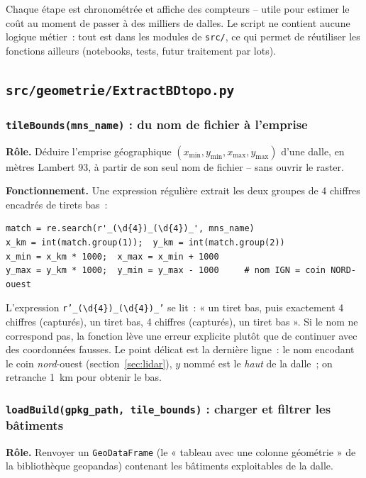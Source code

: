 \documentclass[11pt,a4paper]{article}
\newcommand{\fichier}[1]{\texttt{#1}}
\newcommand{\fonction}[1]{\texttt{#1}}
\begin{document}
Chaque étape est chronométrée et affiche des compteurs -- utile pour estimer le
coût au moment de passer à des milliers de dalles. Le script ne contient aucune
logique métier~: tout est dans les modules de \fichier{src/}, ce qui permet de
réutiliser les fonctions ailleurs (notebooks, tests, futur traitement par lots).

\subsection{\fichier{src/geometrie/ExtractBDtopo.py}}

\subsubsection{\fonction{tileBounds(mns\_name)} : du nom de fichier à l'emprise}

\textbf{Rôle.} Déduire l'emprise géographique $(x_{\min}, y_{\min}, x_{\max},
y_{\max})$ d'une dalle, en mètres Lambert 93, à partir de son seul nom de
fichier -- sans ouvrir le raster.

\textbf{Fonctionnement.} Une expression régulière extrait les deux groupes de 4
chiffres encadrés de tirets bas~:

\begin{lstlisting}
match = re.search(r'_(\d{4})_(\d{4})_', mns_name)
x_km = int(match.group(1));  y_km = int(match.group(2))
x_min = x_km * 1000;  x_max = x_min + 1000
y_max = y_km * 1000;  y_min = y_max - 1000     # nom IGN = coin NORD-ouest
\end{lstlisting}

L'expression \fonction{r'\_(\textbackslash d\{4\})\_(\textbackslash d\{4\})\_'}
se lit~: « un tiret bas, puis exactement 4 chiffres (capturés), un tiret bas, 4
chiffres (capturés), un tiret bas ». Si le nom ne correspond pas, la fonction
lève une erreur explicite plutôt que de continuer avec des coordonnées fausses.
Le point délicat est la dernière ligne~: le nom encodant le coin
\emph{nord}-ouest (section~\ref{sec:lidar}), $y$ nommé est le \emph{haut} de la
dalle~; on retranche 1~km pour obtenir le bas.

\subsubsection{\fonction{loadBuild(gpkg\_path, tile\_bounds)} : charger et filtrer les bâtiments}

\textbf{Rôle.} Renvoyer un \fonction{GeoDataFrame} (le « tableau avec une
colonne géométrie » de la bibliothèque geopandas) contenant les bâtiments
exploitables de la dalle.
\end{document}
